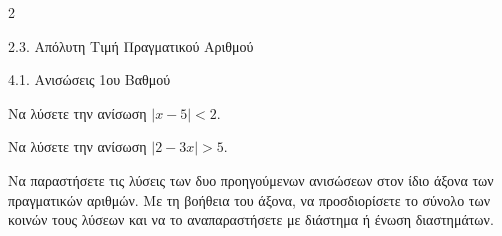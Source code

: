 \begin{ylh}{2}
    \item 2.3. Απόλυτη Τιμή Πραγματικού Αριθμού
    \item 4.1. Ανισώσεις 1ου Βαθμού
\end{ylh}

\begin{alist}
\item Να λύσετε την ανίσωση $|x - 5| < 2$.
\item Να λύσετε την ανίσωση $|2 - 3x| > 5$.
\item Να παραστήσετε τις λύσεις των δυο προηγούμενων ανισώσεων στον ίδιο άξονα των πραγματικών αριθμών. Με τη βοήθεια του άξονα, να προσδιορίσετε το σύνολο των κοινών τους λύσεων και να το αναπαραστήσετε με διάστημα ή ένωση διαστημάτων.
\end{alist}

